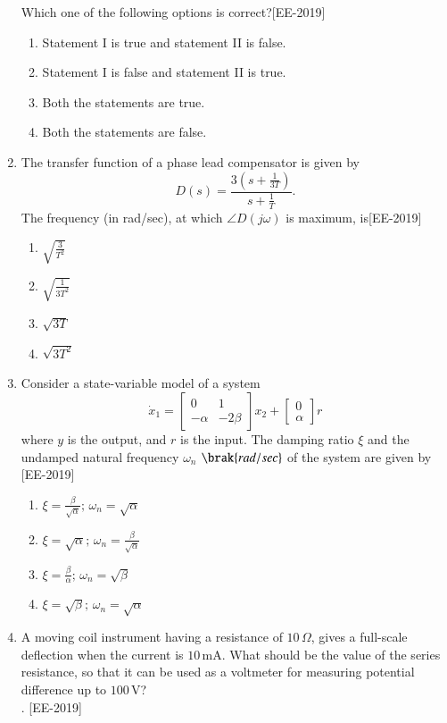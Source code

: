 \documentclass[journal]{IEEEtran}
\begin{document}
\begin{enumerate}
Which one of the following options is correct?\hfill{[EE-2019]}
\begin{enumerate}
    \item  Statement I is true and statement II is false.
    \item  Statement I is false and statement II is true.
    \item  Both the statements are true.
    \item  Both the statements are false.
\end{enumerate}

\item The transfer function of a phase lead compensator is given by
\[
D(s) = \frac{3(s+\frac{1}{3T})}{s+\frac{1}{T}}.
\]
The frequency (in rad/sec), at which $\angle D(j\omega)$ is maximum, is\hfill{[EE-2019]}
\begin{multicols}{4}
    

\begin{enumerate}
    \item  $\sqrt{\frac{3}{T^2}}$
    \item  $\sqrt{\frac{1}{3T^2}}$
    \item  $\sqrt{3T}$
    \item  $\sqrt{3T^2}$
\end{enumerate}
\end{multicols}
\item Consider a state-variable model of a system
\[
\dot{x}_1 = \begin{bmatrix} 0 & 1 \\ -\alpha & -2\beta \end{bmatrix} x_2 + \begin{bmatrix} 0 \\ \alpha \end{bmatrix} r
\]
where $y$ is the output, and $r$ is the input. The damping ratio $\xi$ and the undamped natural frequency $\omega_n$ $\brak{rad/sec}$ of the system are given by \hfill{[EE-2019]}
\begin{multicols}{2}
    

\begin{enumerate}
    \item  $\xi = \frac{\beta}{\sqrt{\alpha}}; \, \omega_n = \sqrt{\alpha}$
    \item  $\xi = \sqrt{\alpha}; \, \omega_n = \frac{\beta}{\sqrt{\alpha}}$
    \item  $\xi = \frac{\beta}{\alpha}; \, \omega_n = \sqrt{\beta}$
    \item  $\xi = \sqrt{\beta}; \, \omega_n = \sqrt{\alpha}$
\end{enumerate}
\end{multicols}
\item A moving coil instrument having a resistance of $10 \, \Omega$, gives a full-scale deflection when the current is $10 \, \text{mA}$. What should be the value of the series resistance, so that it can be used as a voltmeter for measuring potential difference up to $100 \, \text{V}$? \\. \hfill{[EE-2019]}
\begin{multicols}{4}
    


\end{multicols}
\end{enumerate}
\end{document}
